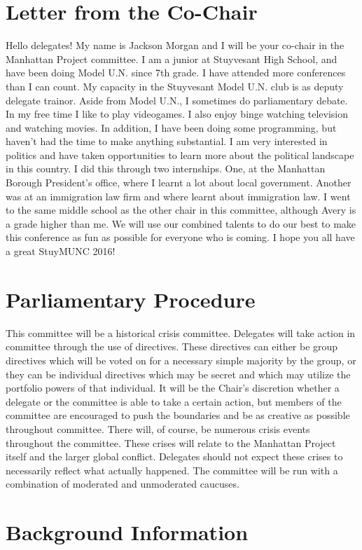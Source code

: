 \documentclass[11 pt, twoside]{article}
\begin{document}
\section{Letter from the Co-Chair}
	Hello delegates! My name is Jackson Morgan and I will be your co-chair in the Manhattan Project committee. I am a junior at Stuyvesant High School, and have been doing Model U.N. since 7th grade. I have attended more conferences than I can count. My capacity in the Stuyvesant Model U.N. club is as deputy delegate trainor. Aside from Model U.N., I sometimes do parliamentary debate. In my free time I like to play videogames. I also enjoy binge watching television and watching movies. In addition, I have been doing some programming, but haven’t had the time to make anything substantial.
	I am very interested in politics and have taken opportunities to learn more about the political landscape in this country. I did this through two internships. One, at the Manhattan Borough President’s office, where I learnt a lot about local government. Another was at an immigration law firm and where learnt about immigration law. 	
	I went to the same middle school as the other chair in this committee, although Avery is a grade higher than me. We will use our combined talents to do our best to make this conference as fun as possible for everyone who is coming. I hope you all have a great StuyMUNC 2016!

\section{Parliamentary Procedure}
	This committee will be a historical crisis committee. Delegates will take action in committee through the use of directives. These directives can either be group directives which will be voted on for a necessary simple majority by the group, or they can be individual directives which may be secret and which may utilize the portfolio powers of that individual. It will be the Chair’s discretion whether a delegate or the committee is able to take a certain action, but members of the committee are encouraged to push the boundaries and be as creative as possible throughout committee. There will, of course, be numerous crisis events throughout the committee. These crises will relate to the Manhattan Project itself and the larger global conflict. Delegates should not expect these crises to necessarily reflect what actually happened. The committee will be run with a combination of moderated and unmoderated caucuses.

\section{Background Information}
\end{document}
